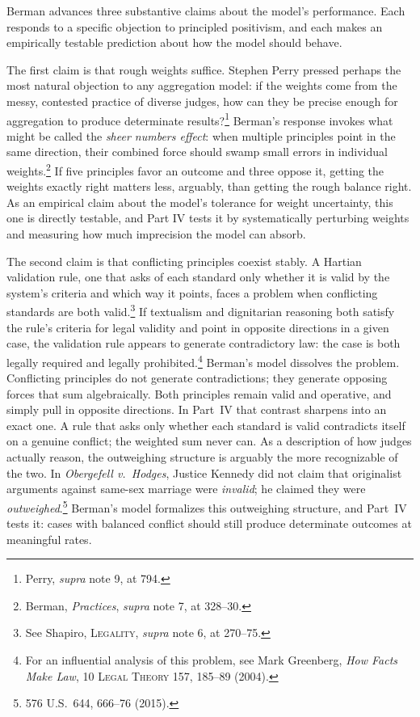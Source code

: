 Berman advances three substantive claims about the model's performance.
Each responds to a specific objection to principled positivism, and each
makes an empirically testable prediction about how the model should
behave.

The first claim is that rough weights suffice. Stephen Perry pressed
perhaps the most natural objection to any aggregation model: if the
weights come from the messy, contested practice of diverse
judges, how can they be precise enough for aggregation to produce
determinate results?\footnote{Perry, \textit{supra} note 9, at 794.}
Berman's response invokes what might be called the \textit{sheer numbers
effect}: when multiple principles point in the same direction, their combined force
should swamp small errors in individual
weights.\footnote{Berman, \textit{Practices}, \textit{supra} note 7, at 328--30.} If five principles favor an outcome and three oppose it, getting the
weights exactly right matters less, arguably, than getting the rough
balance right. As an empirical claim about the model's tolerance for weight uncertainty,
this one is directly testable, and Part IV tests it by systematically
perturbing weights and measuring how much imprecision the model can absorb.

The second claim is that conflicting principles coexist stably. A Hartian
validation rule, one that asks of each standard only whether it is valid by
the system's criteria and which way it points, faces a problem when
conflicting standards are both valid.\footnote{See Shapiro,
\textsc{Legality}, \textit{supra} note 6, at 270--75.} If textualism and
dignitarian reasoning both satisfy the rule's criteria for legal validity
and point in opposite directions in a given case, the validation rule
appears to generate contradictory law: the case is both legally required
and legally prohibited.\footnote{For an influential analysis of this
problem, see Mark Greenberg, \textit{How Facts Make Law}, 10 \textsc{Legal
Theory} 157, 185--89 (2004).} Berman's model dissolves the problem.
Conflicting principles do not generate contradictions; they generate
opposing forces that sum algebraically. Both principles remain valid and operative, and simply pull in opposite
directions. In Part~IV that contrast sharpens into an exact one. A rule
that asks only whether each standard is valid contradicts itself on a
genuine conflict; the weighted sum never can. As a description of how
judges actually reason, the outweighing structure is arguably the more
recognizable of the two. In \textit{Obergefell v.\ Hodges}, Justice Kennedy
did not claim that originalist arguments against same-sex marriage were
\textit{invalid}; he claimed they were \textit{outweighed}.\footnote{576
U.S.\ 644, 666--76 (2015).} Berman's model formalizes this outweighing
structure, and Part~IV tests it: cases with balanced conflict should still
produce determinate outcomes at meaningful rates.

